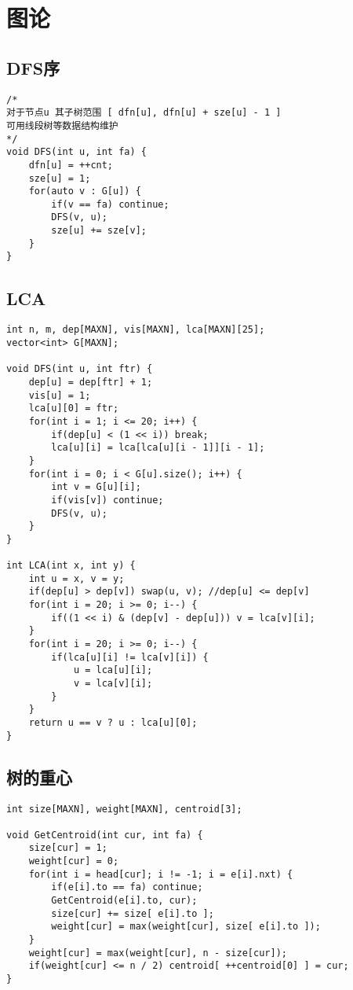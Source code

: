 \section{图论}

\subsection{DFS序}
\begin{lstlisting}
/*
对于节点u 其子树范围 [ dfn[u], dfn[u] + sze[u] - 1 ] 
可用线段树等数据结构维护 
*/
void DFS(int u, int fa) {
	dfn[u] = ++cnt;
	sze[u] = 1;
	for(auto v : G[u]) {
		if(v == fa) continue;
		DFS(v, u);
		sze[u] += sze[v];
	}
}
\end{lstlisting}

\subsection{LCA}
\begin{lstlisting}
int n, m, dep[MAXN], vis[MAXN], lca[MAXN][25];
vector<int> G[MAXN];

void DFS(int u, int ftr) {
	dep[u] = dep[ftr] + 1;
	vis[u] = 1;
	lca[u][0] = ftr;
	for(int i = 1; i <= 20; i++) {
		if(dep[u] < (1 << i)) break;
		lca[u][i] = lca[lca[u][i - 1]][i - 1];
	}
	for(int i = 0; i < G[u].size(); i++) {
		int v = G[u][i];
		if(vis[v]) continue;
		DFS(v, u);
	}
}

int LCA(int x, int y) {
	int u = x, v = y;
	if(dep[u] > dep[v]) swap(u, v); //dep[u] <= dep[v]
	for(int i = 20; i >= 0; i--) {
		if((1 << i) & (dep[v] - dep[u])) v = lca[v][i];
	}
	for(int i = 20; i >= 0; i--) {
		if(lca[u][i] != lca[v][i]) {
			u = lca[u][i];
			v = lca[v][i];
		}
	}
	return u == v ? u : lca[u][0];
}
\end{lstlisting}

\subsection{树的重心}
\begin{lstlisting}
int size[MAXN], weight[MAXN], centroid[3];  
 
void GetCentroid(int cur, int fa) {
	size[cur] = 1;
	weight[cur] = 0;
	for(int i = head[cur]; i != -1; i = e[i].nxt) {
		if(e[i].to == fa) continue;
    	GetCentroid(e[i].to, cur);
    	size[cur] += size[ e[i].to ];
    	weight[cur] = max(weight[cur], size[ e[i].to ]);
    }
	weight[cur] = max(weight[cur], n - size[cur]);
	if(weight[cur] <= n / 2) centroid[ ++centroid[0] ] = cur;
}
\end{lstlisting}

